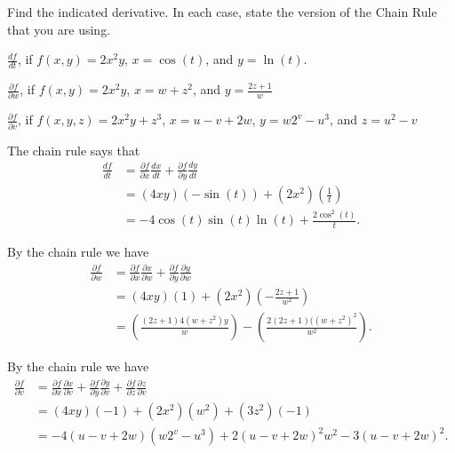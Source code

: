 \begin{exercises} 

\item Find the indicated derivative.  In each case, state the version of the Chain Rule that you are using.
	\ba	
	\item $\frac{df}{dt}$, if $f(x,y) = 2x^2y$, $x=\cos(t)$, and $y=\ln(t)$.

	\item $\frac{\partial f}{\partial w}$, if $f(x,y) = 2x^2y$, $x=w+z^2$, and $y=\frac{2z+1}{w}$



	\item $\frac{\partial f}{\partial v}$, if $f(x,y,z) = 2x^2y+z^3$, $x=u-v+2w$, $y=w2^v-u^3$, and $z = u^2-v$
	\ea

\begin{exerciseSolution}
\ba 
\item The chain rule says that
\begin{align*}
\frac{df}{dt} &= \frac{\partial f}{\partial x}\frac{dx}{dt} + \frac{\partial f}{\partial y}\frac{dy}{dt} \\
	&= (4xy)\left(-\sin(t)\right) + (2x^2)\left(\frac{1}{t}\right) \\
	&= -4 \cos(t) \sin(t) \ln(t) + \frac{2\cos^2(t)}{t}.
\end{align*}
\item By the chain rule we have
\begin{align*}
\frac{\partial f}{\partial w} &= \frac{\partial f}{\partial x} \frac{\partial x}{\partial w}+ \frac{\partial f}{\partial y} \frac{\partial y}{\partial w} \\
	&= \left( 4xy \right)\left( 1 \right) + \left( 2x^2 \right)\left( -\frac{2z+1}{w^2} \right) \\
	&= \left( \frac{(2z+1)4(w+z^2)y}{w} \right) - \left( \frac{2(2z+1)((w+z^2)^2}{w^2} \right).
\end{align*}

\item By the chain rule we have
\begin{align*}
\frac{\partial f}{\partial v} &= \frac{\partial f}{\partial x} \frac{\partial x}{\partial v}+ \frac{\partial f}{\partial y} \frac{\partial y}{\partial v} + \frac{\partial f}{\partial z} \frac{\partial z}{\partial v} \\
	&= \left( 4xy \right)\left( -1 \right) + \left( 2x^2 \right)\left( w^2 \right) + \left( 3z^2 \right)\left( -1 \right)  \\
	&= -4(u-v+2w)(w2^v-u^3) + 2(u-v+2w)^2w^2 - 3(u-v+2w)^2.
\end{align*}


\end{exerciseSolution}
\end{exercises}
